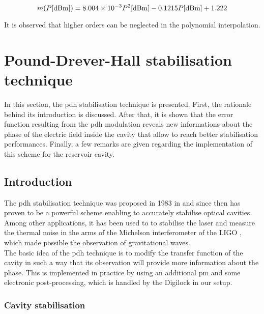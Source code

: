 \begin{equation}
	m(P[\textrm{dBm}]) = \num{8.004d-3} P^2[\textrm{dBm}] - 0.1215 P[\textrm{dBm}] + 1.222
\end{equation}

It is observed that higher orders can be neglected in the polynomial interpolation.


\section{Pound-Drever-Hall stabilisation technique}

\label{sec-pdh}

In this section, the \gls{pdh} stabilisation technique is presented. First, the rationale behind its introduction is discussed. After that, it is shown that the error function resulting from the \gls{pdh} modulation reveals new informations about the phase of the electric field inside the cavity that allow to reach better stabilisation performances. Finally, a few remarks are given regarding the implementation of this scheme for the reservoir cavity.


\subsection{Introduction}

The \gls{pdh} stabilisation technique was proposed in 1983 in \cite{drever1983laser} and since then has proven to be a powerful scheme enabling to accurately stabilise optical cavities. Among other applications, it has been used to to stabilise the laser and measure the thermal noise in the arms of the Michelson interferometer of the LIGO \cite{black1998notes}, which made possible the observation of gravitational waves.\\

The basic idea of the \gls{pdh} technique is to modify the transfer function of the cavity in such a way that its observation will provide more information about the phase. This is implemented in practice by using an additional \gls{pm} and some electronic post-processing, which is handled by the Digilock in our setup.

\subsubsection{Cavity stabilisation}

